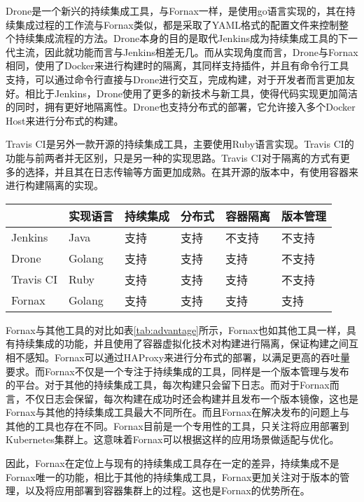 Drone是一个新兴的持续集成工具，与Fornax一样，是使用go语言实现的，其在持续集成过程的工作流与Fornax类似，都是采取了YAML格式的配置文件来控制整个持续集成流程的方法。Drone本身的目的是取代Jenkins成为持续集成工具的下一代主流，因此就功能而言与Jenkins相差无几。而从实现角度而言，Drone与Fornax相同，使用了Docker来进行构建时的隔离，其同样支持插件，并且有命令行工具支持，可以通过命令行直接与Drone进行交互，完成构建，对于开发者而言更加友好。相比于Jenkins，Drone使用了更多的新技术与新工具，使得代码实现更加简洁的同时，拥有更好地隔离性。Drone也支持分布式的部署，它允许接入多个Docker Host来进行分布式的构建。

Travis CI是另外一款开源的持续集成工具，主要使用Ruby语言实现。Travis CI的功能与前两者并无区别，只是另一种的实现思路。Travis CI对于隔离的方式有更多的选择，并且其在日志传输等方面更加成熟。在其开源的版本中，有使用容器来进行构建隔离的实现。

\begin{table}[!hpb]
  \centering
  \begin{tabular}{llllll} \toprule
     & 实现语言 & 持续集成 & 分布式 & 容器隔离 & 版本管理 \\ \midrule
    Jenkins & Java & 支持 & 支持 & 不支持 & 不支持 \\
    Drone & Golang & 支持 & 支持 & 支持 & 不支持 \\
    Travis CI & Ruby & 支持 & 支持 & 支持 & 不支持 \\
    Fornax & Golang & 支持 & 支持 & 支持 & 支持 \\ \bottomrule
  \end{tabular}
\end{table}

Fornax与其他工具的对比如表\ref{tab:advantage}所示，Fornax也如其他工具一样，具有持续集成的功能，并且使用了容器虚拟化技术对构建进行隔离，保证构建之间互相不感知。Fornax可以通过HAProxy来进行分布式的部署，以满足更高的吞吐量要求。而Fornax不仅是一个专注于持续集成的工具，同样是一个版本管理与发布的平台。对于其他的持续集成工具，每次构建只会留下日志。而对于Fornax而言，不仅日志会保留，每次构建在成功时还会构建并且发布一个版本镜像，这也是Fornax与其他的持续集成工具最大不同所在。而且Fornax在解决发布的问题上与其他的工具也存在不同。Fornax目前是一个专用性的工具，只关注将应用部署到Kubernetes集群上。这意味着Fornax可以根据这样的应用场景做适配与优化。

因此，Fornax在定位上与现有的持续集成工具存在一定的差异，持续集成不是Fornax唯一的功能，相比于其他的持续集成工具，Fornax更加关注对于版本的管理，以及将应用部署到容器集群上的过程。这也是Fornax的优势所在。